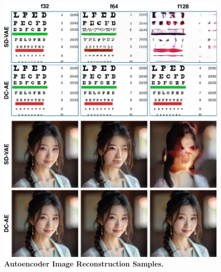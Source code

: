\begin{figure}[t]
    \centering
    \includegraphics[width=0.95\linewidth]{figures/src/ae_visualization.pdf}
    \vspace{-10pt}
    \caption{\textbf{Autoencoder Image Reconstruction Samples.}}
    \vspace{-10pt}
    \label{fig:ae_visualization}
\end{figure}

